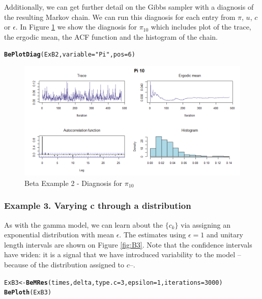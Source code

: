 \documentclass[letterpaper]{article}\usepackage[]{graphicx}\usepackage[]{color}
\makeatletter
\newcommand{\hlnum}[1]{\textcolor[rgb]{0.686,0.059,0.569}{#1}}%
\newcommand{\hlstr}[1]{\textcolor[rgb]{0.192,0.494,0.8}{#1}}%
\newcommand{\hlstd}[1]{\textcolor[rgb]{0.345,0.345,0.345}{#1}}%
\newcommand{\hlkwb}[1]{\textcolor[rgb]{0.69,0.353,0.396}{#1}}%
\newcommand{\hlkwc}[1]{\textcolor[rgb]{0.333,0.667,0.333}{#1}}%
\newcommand{\hlkwd}[1]{\textcolor[rgb]{0.737,0.353,0.396}{\textbf{#1}}}%
\newenvironment{kframe}{%
 \def\at@end@of@kframe{}%
 \ifinner\ifhmode%
  \def\at@end@of@kframe{\end{minipage}}%
  \begin{minipage}{\columnwidth}%
 \fi\fi%
 \def\FrameCommand##1{\hskip\@totalleftmargin \hskip-\fboxsep
 \colorbox{shadecolor}{##1}\hskip-\fboxsep
     \hskip-\linewidth \hskip-\@totalleftmargin \hskip\columnwidth}%
 \MakeFramed {\advance\hsize-\width
   \@totalleftmargin\z@ \linewidth\hsize
   \@setminipage}}%
 {\par\unskip\endMakeFramed%
 \at@end@of@kframe}
\newenvironment{knitrout}{}{} %
\makeatother
\begin{document}
Additionally, we can get further detail on the Gibbs sampler with a diagnosis of the resulting Markov chain. We can run this diagnosis for each entry from $\pi$, $u$, $c$ or $\epsilon$. In Figure \ref{fig:B2a} we show the diagnosis for $\pi_{10}$ which includes plot of the trace, the ergodic mean, the ACF function and the histogram of the chain.

\begin{knitrout}
\color{fgcolor}\begin{kframe}
\begin{alltt}
\hlkwd{BePlotDiag}\hlstd{(ExB2,} \hlkwc{variable} \hlstd{=} \hlstr{"Pi"}\hlstd{,} \hlkwc{pos} \hlstd{=} \hlnum{6}\hlstd{)}
\end{alltt}
\end{kframe}
\end{knitrout}

\begin{figure}
  \centering
  \includegraphics[width=\textwidth]{B23.png}
  \caption{Beta Example 2 - Diagnosis for $\pi_{10}$}
  \label{fig:B2a}
\end{figure}

\subsubsection{Example 3. Varying c through a distribution}

As with the gamma model, we can learn about the $\{c_k\}$ via assigning an exponential distribution with mean $\epsilon$. The estimates using $\epsilon = 1$ and unitary length intervals are shown on Figure \ref{fig:B3}. Note that the confidence intervals have widen: it is a signal that we have introduced variability to the model --because of the distribution assigned to $c$--.
 
\begin{knitrout}
\color{fgcolor}\begin{kframe}
\begin{alltt}
\hlstd{ExB3} \hlkwb{<-} \hlkwd{BeMRes}\hlstd{(times, delta,} \hlkwc{type.c} \hlstd{=} \hlnum{3}\hlstd{,} \hlkwc{epsilon} \hlstd{=} \hlnum{1}\hlstd{,} \hlkwc{iterations} \hlstd{=} \hlnum{3000}\hlstd{)}
\hlkwd{BePloth}\hlstd{(ExB3)}
\end{alltt}
\end{kframe}
\end{knitrout}
\end{document}
